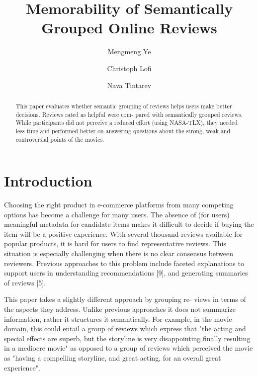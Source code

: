 \documentclass[runningheads,a4paper]{llncs}
\begin{document}
\mainmatter

\title{Memorability of Semantically Grouped Online Reviews}
\author{Mengmeng Ye \and
Christoph Lofi \and
Nava Tintarev}
\maketitle

\begin{abstract}
This paper evaluates whether semantic grouping of reviews helps users make better decisions. Reviews rated as helpful were com- pared with semantically grouped reviews. While participants did not perceive a reduced effort (using NASA-TLX), they needed less time and performed better on answering questions about the strong, weak and controversial points of the movies.

\end{abstract}


\section{Introduction}

Choosing the right product in e-commerce platforms from many competing options has become a challenge for many users. The absence of (for users) meaningful metadata for candidate items makes it difficult to decide if buying the item will be a positive experience. With several thousand reviews available for popular products, it is hard for users to find representative reviews. This situation is especially challenging when there is no clear consensus between reviewers. Previous approaches to this problem include faceted explanations to support users in understanding recommendations [9], and generating summaries of reviews [5].

This paper takes a slightly different approach by grouping re- views in terms of the aspects they address. Unlike previous approaches it does not summarize information, rather it structures it semantically. For example, in the movie domain, this could entail a group of reviews which express that "the acting and special effects are superb, but the storyline is very disappointing finally resulting in a mediocre movie" as opposed to a group of reviews which perceived the movie as "having a compelling storyline, and great acting, for an overall great experience".
\end{document}
